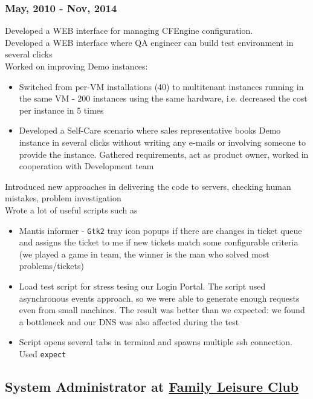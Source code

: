 \documentclass[letterpaper]{article}
\begin{document}
\subsubsection{May, 2010 - Nov, 2014}
\label{sec-2-3-1}
Developed a WEB interface for managing CFEngine configuration.\\
Developed a WEB interface where QA engineer can build test environment in several clicks\\
Worked on improving Demo instances:
\begin{itemize}
\item Switched from per-VM installations (40) to multitenant instances running in the same VM - 200 instances using the same hardware, i.e. decreased the cost per instance in 5 times
\item Developed a Self-Care scenario where sales representative books Demo instance in several clicks without writing any e-mails or involving someone to provide the instance. Gathered requirements, act as product owner, worked in cooperation with Development team
\end{itemize}
Introduced new approaches in delivering the code to servers, checking human mistakes, problem investigation\\
Wrote a lot of useful scripts such as
\begin{itemize}
\item Mantis informer - \verb~Gtk2~ tray icon popups if there are changes in ticket queue and assigns the ticket to me if new tickets match some configurable criteria (we played a game in team, the winner is the man who solved most problems/tickets)
\item Load test script for stress tesing our Login Portal. The script used asynchronous events approach, so we were able to generate enough requests even from small machines. The result was better than we expected: we found a bottleneck and our DNS was also affected during the test
\item Script opens several tabs in terminal and spawns multiple ssh connection. Used \verb~expect~
\end{itemize}
\subsection{System Administrator at \href{https://www.ksd.ua/en/}{Family Leisure Club}}
\label{sec-2-4}
\end{document}

